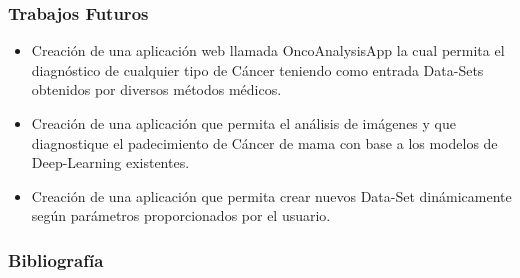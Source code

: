 \documentclass[xcolor=dvipsnames,xcolor=table]{beamer} %
\begin{document}
\begin{frame}
	\frametitle{Trabajos Futuros}
	\begin{itemize}\justifying
		\item Creación de una aplicación web llamada OncoAnalysisApp la cual permita el diagnóstico de cualquier tipo de Cáncer teniendo como entrada Data-Sets obtenidos por diversos métodos médicos.
		\item Creación de una aplicación que permita el análisis de imágenes y que diagnostique el padecimiento de Cáncer de mama con base a los modelos de Deep-Learning existentes.
		\item Creación de una aplicación que permita crear nuevos Data-Set dinámicamente según parámetros proporcionados por el usuario. 
	\end{itemize}
\end{frame}



\begin{frame}
	\frametitle{Bibliografía}	
	
	
\end{frame}
\end{document}
